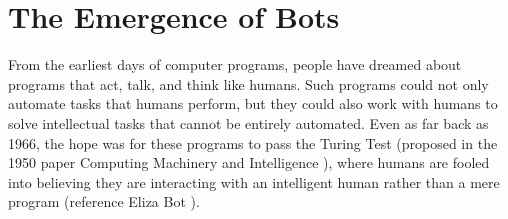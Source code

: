 \documentclass{sig-alternate}
\begin{document}
%
\author{
% 
%
\alignauthor
XXX\\
       \\
}

\date{29 Sept 2017}

\maketitle
%




\section{The Emergence of Bots} 


From the earliest days of computer programs, people have dreamed about programs that act, talk, and think like humans.
Such programs could not only automate tasks that humans perform, but they could also work with humans to solve intellectual tasks that cannot be entirely automated. 
Even as far back as 1966, the hope was for these programs to pass the Turing Test (proposed in the 1950 paper Computing Machinery and Intelligence \cite{Turing-1950}), where humans are fooled into believing they are interacting with an intelligent human rather than a mere program (reference Eliza Bot \cite{Weizenbaum:1966:ECP:365153.365168}). 
\end{document}
